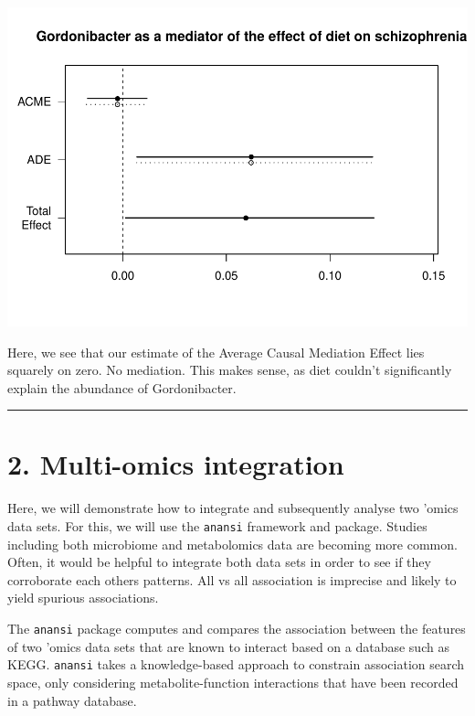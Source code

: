 \documentclass[
]{article}
\begin{document}
\includegraphics{README_part2_files/figure-latex/plot_gordo-1.pdf}

Here, we see that our estimate of the Average Causal Mediation Effect
lies squarely on zero. No mediation. This makes sense, as diet couldn't
significantly explain the abundance of Gordonibacter.

\begin{center}\rule{0.5\linewidth}{0.5pt}\end{center}

\newpage

\hypertarget{multi-omics-integration}{%
\section{2. Multi-omics integration}\label{multi-omics-integration}}

Here, we will demonstrate how to integrate and subsequently analyse two
'omics data sets. For this, we will use the \texttt{anansi} framework
and package. Studies including both microbiome and metabolomics data are
becoming more common. Often, it would be helpful to integrate both data
sets in order to see if they corroborate each others patterns. All vs
all association is imprecise and likely to yield spurious associations.

The \texttt{anansi} package computes and compares the association
between the features of two 'omics data sets that are known to interact
based on a database such as KEGG. \texttt{anansi} takes a
knowledge-based approach to constrain association search space, only
considering metabolite-function interactions that have been recorded in
a pathway database.
\end{document}
